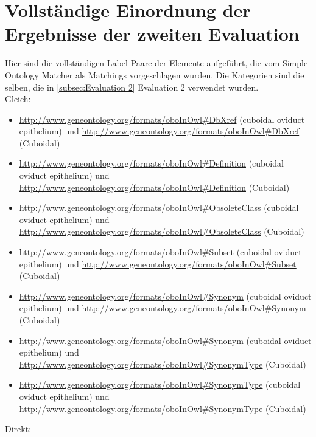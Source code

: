 \section{Vollständige Einordnung der Ergebnisse der zweiten Evaluation}
\label{app:second_appendix}
Hier sind die vollständigen Label Paare der Elemente aufgeführt, die vom Simple
Ontology Matcher als Matchings vorgeschlagen wurden. Die Kategorien sind die
selben, die in \ref{subsec:Evaluation 2} Evaluation 2 verwendet wurden.\\
Gleich:
\begin{itemize}
	\item \url{http://www.geneontology.org/formats/oboInOwl#DbXref} (cuboidal oviduct epithelium) und \url{http://www.geneontology.org/formats/oboInOwl#DbXref} (Cuboidal\textunderscoreEpithelium)
	\item \url{http://www.geneontology.org/formats/oboInOwl#Definition} (cuboidal oviduct epithelium) und \url{http://www.geneontology.org/formats/oboInOwl#Definition} (Cuboidal\textunderscoreEpithelium)
	\item \url{http://www.geneontology.org/formats/oboInOwl#ObsoleteClass} (cuboidal oviduct epithelium) und \url{http://www.geneontology.org/formats/oboInOwl#ObsoleteClass} (Cuboidal\textunderscoreEpithelium)
	\item \url{http://www.geneontology.org/formats/oboInOwl#Subset} (cuboidal oviduct epithelium) und \url{http://www.geneontology.org/formats/oboInOwl#Subset} (Cuboidal\textunderscoreEpithelium)
	\item \url{http://www.geneontology.org/formats/oboInOwl#Synonym} (cuboidal oviduct epithelium) und \url{http://www.geneontology.org/formats/oboInOwl#Synonym} (Cuboidal\textunderscoreEpithelium)
	\item \url{http://www.geneontology.org/formats/oboInOwl#Synonym} (cuboidal oviduct epithelium) und \url{http://www.geneontology.org/formats/oboInOwl#SynonymType} (Cuboidal\textunderscoreEpithelium)
	\item \url{http://www.geneontology.org/formats/oboInOwl#SynonymType} (cuboidal oviduct epithelium) und \url{http://www.geneontology.org/formats/oboInOwl#SynonymType} (Cuboidal\textunderscoreEpithelium)
\end{itemize}
Direkt:
